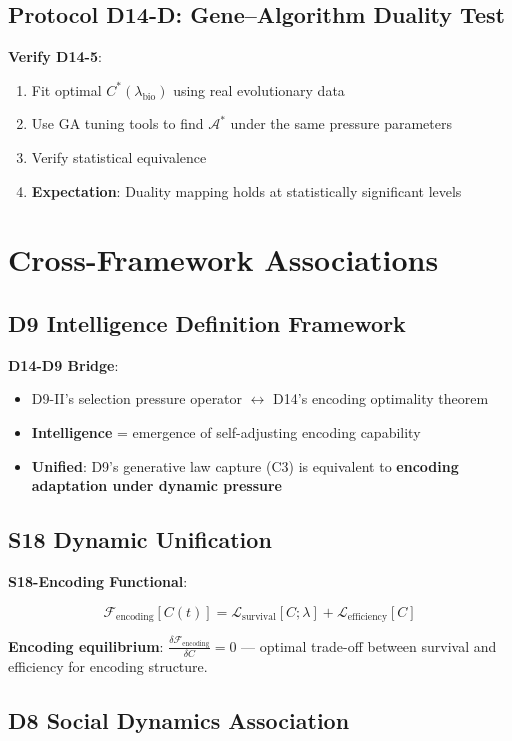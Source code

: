 \documentclass[12pt,a4paper]{article}
\newcommand{\calLsurv}{\mathcal{L}_{\text{survival}}}
\newcommand{\calLeff}{\mathcal{L}_{\text{efficiency}}}
\newcommand{\calFenc}{\mathcal{F}_{\text{encoding}}}
\newcommand{\calFencdelta}{\frac{\delta \mathcal{F}_{\text{encoding}}}{\delta C}}
\newcommand{\calCstar}{C^*}
\newcommand{\calAstar}{\mathcal{A}^*}
\newcommand{\lambio}{\lambda_{\text{bio}}}
\begin{document}
\subsection{Protocol D14-D: Gene--Algorithm Duality Test}

\textbf{Verify D14-5}:
\begin{enumerate}
    \item Fit optimal $\calCstar(\lambio)$ using real evolutionary data
    \item Use GA tuning tools to find $\calAstar$ under the same pressure parameters
    \item Verify statistical equivalence
    \item \textbf{Expectation}: Duality mapping holds at statistically significant levels
\end{enumerate}

\section{Cross-Framework Associations}

\subsection{D9 Intelligence Definition Framework}

\textbf{D14-D9 Bridge}:
\begin{itemize}
    \item D9-II's selection pressure operator $\leftrightarrow$ D14's encoding optimality theorem
    \item \textbf{Intelligence} = emergence of self-adjusting encoding capability
    \item \textbf{Unified}: D9's generative law capture (C3) is equivalent to \textbf{encoding adaptation under dynamic pressure}
\end{itemize}

\subsection{S18 Dynamic Unification}

\textbf{S18-Encoding Functional}:

$$\calFenc[C(t)] = \calLsurv[C; \lambda] + \calLeff[C]$$

\textbf{Encoding equilibrium}: $\calFencdelta = 0$ --- optimal trade-off between survival and efficiency for encoding structure.

\subsection{D8 Social Dynamics Association}
\end{document}
